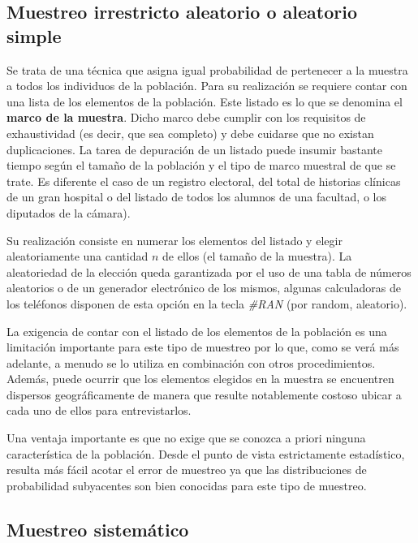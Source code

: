 \documentclass[]{book}
\begin{document}
\hypertarget{muestreo-irrestricto-aleatorio-o-aleatorio-simple}{%
\subsection{Muestreo irrestricto aleatorio o aleatorio simple}\label{muestreo-irrestricto-aleatorio-o-aleatorio-simple}}

Se trata de una técnica que asigna igual probabilidad de pertenecer a la
muestra a todos los individuos de la población. Para su realización se
requiere contar con una lista de los elementos de la población. Este
listado es lo que se denomina el \textbf{marco de la muestra}. Dicho marco
debe cumplir con los requisitos de exhaustividad (es decir, que sea
completo) y debe cuidarse que no existan duplicaciones. La tarea de
depuración de un listado puede insumir bastante tiempo según el tamaño
de la población y el tipo de marco muestral de que se trate. Es
diferente el caso de un registro electoral, del total de historias
clínicas de un gran hospital o del listado de todos los alumnos de una
facultad, o los diputados de la cámara).

Su realización consiste en numerar los elementos del listado y elegir
aleatoriamente una cantidad \(n\) de ellos (el tamaño de la muestra). La
aleatoriedad de la elección queda garantizada por el uso de una tabla de
números aleatorios o de un generador electrónico de los mismos, algunas
calculadoras de los teléfonos disponen de esta opción en la tecla \emph{\#RAN} (por random, aleatorio).

La exigencia de contar con el listado de los elementos de la población
es una limitación importante para este tipo de muestreo por lo que, como
se verá más adelante, a menudo se lo utiliza en combinación con otros
procedimientos. Además, puede ocurrir que los elementos elegidos en la
muestra se encuentren dispersos geográficamente de manera que resulte
notablemente costoso ubicar a cada uno de ellos para entrevistarlos.

Una ventaja importante es que no exige que se conozca a priori ninguna
característica de la población. Desde el punto de vista estrictamente
estadístico, resulta más fácil acotar el error de muestreo ya que las
distribuciones de probabilidad subyacentes son bien conocidas para este
tipo de muestreo.

\hypertarget{muestreo-sistemuxe1tico}{%
\subsection{Muestreo sistemático}\label{muestreo-sistemuxe1tico}}
\end{document}
